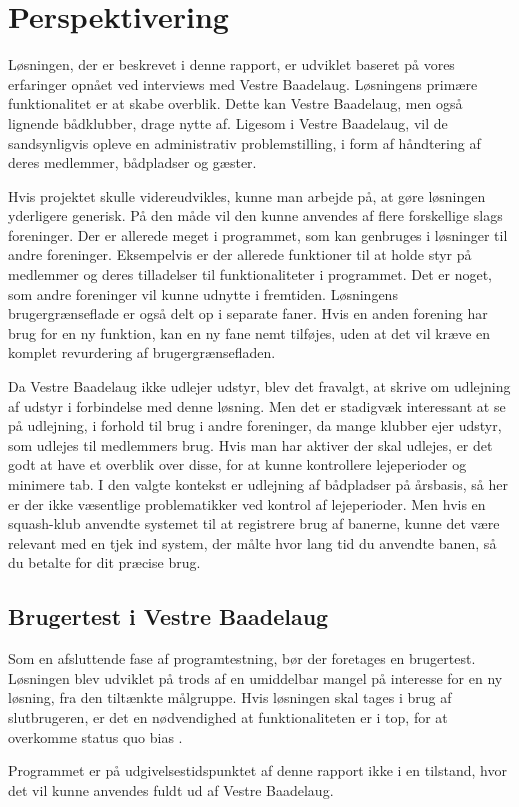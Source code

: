 \chapter{Perspektivering}
\label{cha:perspektivering}

Løsningen, der er beskrevet i denne rapport, er udviklet baseret på vores erfaringer opnået ved interviews med Vestre Baadelaug. Løsningens primære funktionalitet er at skabe overblik. Dette kan Vestre Baadelaug, men også lignende bådklubber, drage nytte af. Ligesom i Vestre Baadelaug, vil de sandsynligvis opleve en administrativ problemstilling, i form af håndtering af deres medlemmer, bådpladser og gæster.

Hvis projektet skulle videreudvikles, kunne man arbejde på, at gøre løsningen yderligere generisk. På den måde vil den kunne anvendes af flere forskellige slags foreninger. Der er allerede meget i programmet, som kan genbruges i løsninger til andre foreninger. Eksempelvis er der allerede funktioner til at holde styr på medlemmer og deres tilladelser til funktionaliteter i programmet. Det er noget, som andre foreninger vil kunne udnytte i fremtiden. Løsningens brugergrænseflade er også delt op i separate faner. Hvis en anden forening har brug for en ny funktion, kan en ny fane nemt tilføjes, uden at det vil kræve en komplet revurdering af brugergrænsefladen.

Da Vestre Baadelaug ikke udlejer udstyr, blev det fravalgt, at skrive om udlejning af udstyr i forbindelse med denne løsning. Men det er stadigvæk interessant at se på udlejning, i forhold til brug i andre foreninger, da mange klubber ejer udstyr, som udlejes til medlemmers brug. Hvis man har aktiver der skal udlejes, er det godt at have et overblik over disse, for at kunne kontrollere lejeperioder og minimere tab. I den valgte kontekst er udlejning af bådpladser på årsbasis, så her er der ikke væsentlige problematikker ved kontrol af lejeperioder. Men hvis en squash-klub anvendte systemet til at registrere brug af banerne, kunne det være relevant med en tjek ind system, der målte hvor lang tid du anvendte banen, så du betalte for dit præcise brug.

\section*{Brugertest i Vestre Baadelaug}

Som en afsluttende fase af programtestning, bør der foretages en brugertest. Løsningen blev udviklet på trods af en umiddelbar mangel på interesse for en ny løsning, fra den tiltænkte målgruppe. Hvis løsningen skal tages i brug af slutbrugeren, er det en nødvendighed at funktionaliteten er i top, for at overkomme status quo bias \cite{statusquo}.

Programmet er på udgivelsestidspunktet af denne rapport ikke i en tilstand, hvor det vil kunne anvendes fuldt ud af Vestre Baadelaug.